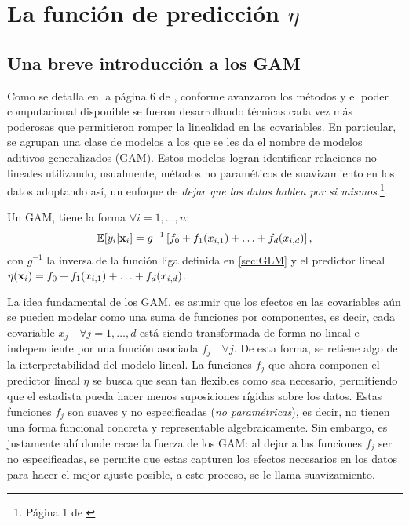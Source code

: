 \documentclass[../Main/Main.tex]{subfiles}
\begin{document}
\section{La función de predicción $\eta$} \label{sec:FuncPred} 
\subsection{Una breve introducción a los GAM}
Como se detalla en la página 6 de \citet{james2013introduction}, conforme avanzaron los métodos y el poder computacional disponible se fueron desarrollando técnicas cada vez más poderosas que permitieron romper la linealidad en las covariables. En particular, \citeauthor{hastie1990generalized} se agrupan una clase de modelos a los que se les da el nombre de modelos aditivos generalizados (GAM). Estos modelos logran identificar relaciones no lineales utilizando, usualmente, métodos no paraméticos de suavizamiento en los datos  adoptando así, un enfoque de \textit{dejar que los datos hablen por si mismos}.\footnote{Página 1 de \citet{hastie1990generalized}}\\

\begin{definition} \label{def:GAM}
Un GAM, tiene la forma $\forall i =1,\ldots,n$:
\begin{align}
	\mathbb{E}[y_i|\mathbf{x}_i] = g^{-1}\left[f_0 + f_1(x_{i,1}) + \ldots + f_d(x_{i,d})\right],\label{ec:GAM}
\end{align}
con $g^{-1}$ la inversa de la función liga definida en \ref{sec:GLM} y el predictor lineal $\eta(\mathbf{x}_i) = f_0 + f_1(x_{i,1}) + \ldots + f_d(x_{i,d})$. 
\end{definition}

La idea fundamental de los GAM, es asumir que los efectos en las covariables aún se pueden modelar como una suma de funciones por componentes, es decir, cada covariable $x_j \quad \forall j =1,\ldots,d$ está siendo transformada de forma no lineal e independiente por una función asociada $f_j \quad \forall j$. De esta forma, se retiene algo de la interpretabilidad del modelo lineal. La funciones $f_j$ que ahora componen el predictor lineal $\eta$ se busca que sean tan flexibles como sea necesario, permitiendo que el estadista pueda hacer menos suposiciones rígidas sobre los datos. Estas funciones $f_j$ son suaves y no especificadas (\textit{no paramétricas}), es decir, no tienen una forma funcional concreta y representable algebraicamente. Sin embargo, es justamente ahí donde recae la fuerza de los GAM: al dejar a las funciones $f_j$ ser no especificadas, se permite que estas capturen los efectos necesarios en los datos para hacer el mejor ajuste posible, a este proceso, se le llama suavizamiento. 
\end{document}
